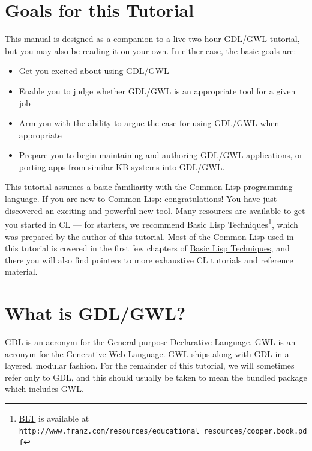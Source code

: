\documentclass [11pt]{book}
\begin{document}
\section{Goals for this Tutorial}

\label{sec:goalsforthistutorial}

This manual is designed as a companion to a live two-hour GDL/GWL tutorial, but you may
also be reading it on your own. In either case, the basic goals are:

\begin{itemize}

\item Get you excited about using GDL/GWL

\item Enable you to judge whether GDL/GWL is an appropriate tool for a given job

\item Arm you with the ability to argue the case for using GDL/GWL when appropriate

\item Prepare you to begin maintaining and authoring GDL/GWL applications, or porting apps
from similar KB systems into GDL/GWL.

\end{itemize}

This tutorial assumes a basic familiarity with the Common Lisp programming language. If you are new to Common Lisp: congratulations! You have just 
discovered an exciting and powerful new tool. Many resources are available to get you started 
in CL --- for starters, we recommend 
\underline{Basic Lisp Techniques}\footnote{
\underline{BLT} is available at \texttt{http://www.franz.com/resources/educational\_resources/cooper.book.pdf}}, which was prepared by the author of this tutorial. Most of the Common Lisp used in this tutorial is covered in the first few chapters of 
\underline{Basic Lisp Techniques}, and there you will also find pointers to more exhaustive CL tutorials and reference material.

\section{What is GDL/GWL?}

\label{sec:whatisgdl/gwl?}

GDL is an acronym for the General-purpose Declarative Language. GWL is an acronym for
the Generative Web Language. GWL ships along with GDL in a layered, modular fashion. For the 
remainder of this tutorial, we will sometimes refer only to GDL, and this should usually be taken 
to mean the bundled package which includes GWL.
\end{document}
